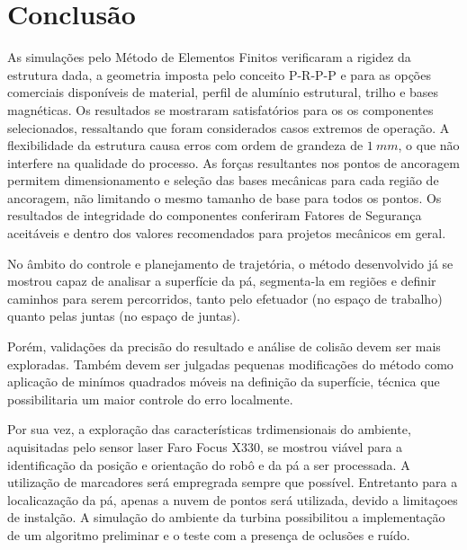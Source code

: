 \section{Conclusão}

As simulações pelo Método de Elementos Finitos verificaram a rigidez da
estrutura dada, a geometria imposta pelo conceito P-R-P-P e para as opções
comerciais disponíveis de material, perfil de alumínio estrutural, trilho e bases
magnéticas.
Os resultados se mostraram satisfatórios para os os componentes selecionados,
ressaltando que foram considerados casos extremos de operação. A flexibilidade
da estrutura causa erros com ordem de grandeza de $1~mm$, o que não interfere na
qualidade do processo.
As forças resultantes nos pontos de ancoragem permitem dimensionamento e seleção
das bases mecânicas para cada região de ancoragem, não limitando o mesmo tamanho
de base para todos os pontos.
Os resultados de integridade do componentes conferiram Fatores de Segurança
aceitáveis e dentro dos valores recomendados para projetos mecânicos em geral.


No âmbito do controle e planejamento de trajetória, o método desenvolvido já se
mostrou capaz de analisar a superfície da pá, segmenta-la em regiões e definir
caminhos para serem percorridos, tanto pelo efetuador (no espaço de trabalho)
quanto pelas juntas (no espaço de juntas).

Porém, validações da precisão do resultado e análise de colisão devem ser mais
exploradas. Também devem ser julgadas pequenas modificações do método como
aplicação de minímos quadrados móveis na definição da superfície, técnica 
que possibilitaria um maior controle do erro localmente.


Por sua vez, a exploração das características trdimensionais do ambiente,
aquisitadas pelo sensor laser Faro Focus X330, se mostrou viável para a identificação da posição
e orientação do robô e da pá a ser processada.
A utilização de marcadores será empregrada sempre que possível. Entretanto para
a localicazação da pá, apenas a nuvem de pontos será utilizada, devido a
limitaçoes de instalção.
A simulação do ambiente da turbina possibilitou a implementação de um algoritmo preliminar e o
teste com a presença de oclusões e ruído.
